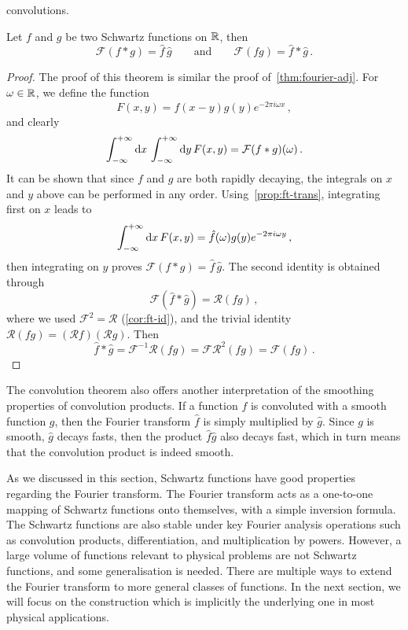 convolutions.
\begin{theorem}
	Let $f$ and $g$ be two Schwartz functions on $\mathbb{R}$, then
	\begin{equation}
		\mathcal{F}(f\ast g)=\hat{f}\,\hat{g}\qquad\text{and}\qquad
		\mathcal{F}(fg)=\hat{f}\ast\hat{g}\,.
	\end{equation}
\end{theorem}
\begin{proof}
	The proof of this theorem is similar the proof of~\cref{thm:fourier-adj}. For
	$\omega\in\mathbb{R}$, we define the function
	\begin{equation}
		F(x,y)=f(x-y)g(y)e^{-2\pi i \omega x}\,,
	\end{equation}
	and clearly
	\begin{equation}
		\int_{-\infty}^{+\infty}\mathrm{d}{x}\,\int_{-\infty}^{+\infty}\mathrm{d}{y}\,F(x,y)=\mathcal{F}(f\ast g)(\omega)\,.
	\end{equation}
	It can be shown that since $f$ and $g$ are both rapidly decaying, the integrals on $x$
	and $y$ above can be performed in any order. Using~\cref{prop:ft-trans}, integrating
	first on $x$ leads to
	\begin{equation}
		\int_{-\infty}^{+\infty}\mathrm{d}{x}\,F(x,y)=\hat{f}(\omega)g(y)e^{-2\pi i\omega y}\,,
	\end{equation}
	then integrating on $y$ proves $\mathcal{F}(f\ast g)=\hat{f}\,\hat{g}$. The second
	identity is obtained through
	\begin{equation}
		\mathcal{F}(\hat{f}\ast\hat{g})=\mathcal{R}(fg)\,,
	\end{equation}
	where we used $\mathcal{F}^2=\mathcal{R}$ (\cref{cor:ft-id}), and the trivial identity
	$\mathcal{R}(fg)=(\mathcal{R}f)(\mathcal{R}g)$. Then
	\begin{equation}
		\hat{f}\ast\hat{g}=\mathcal{F}^{-1}\mathcal{R}(fg)=\mathcal{F}\mathcal{R}^2(fg)
		=\mathcal{F}(fg)\,.
	\end{equation}
\end{proof}
The convolution theorem also offers another interpretation of the smoothing properties of
convolution products. If a function $f$ is convoluted with a smooth function $g$, then the
Fourier transform $\hat{f}$ is simply multiplied by $\hat{g}$. Since $g$ is smooth,
$\hat{g}$ decays fasts, then the product $\hat{f}\hat{g}$ also decays fast, which in turn
means that the convolution product is indeed smooth.

As we discussed in this section, Schwartz functions have good properties regarding the
Fourier transform. The Fourier transform acts as a one-to-one mapping of Schwartz
functions onto themselves, with a simple inversion formula. The Schwartz functions are
also stable under key Fourier analysis operations such as convolution products,
differentiation, and multiplication by powers. However, a large volume of functions
relevant to physical problems are not Schwartz functions, and some generalisation is
needed. There are multiple ways to extend the Fourier transform to more general classes
of functions. In the next section, we will focus on the construction which is implicitly
the underlying one in most physical applications.
